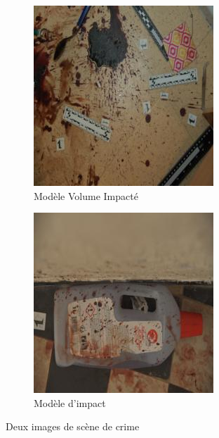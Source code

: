 \documentclass[a4paper]{article}
\begin{document}
\begin{figure}[H]
    \centering
    \begin{subfigure}{0.40\linewidth}
        \centering
        \includegraphics[width=\linewidth]{../asset/data_real/12.jpg}
        \caption{Modèle Volume Impacté}
    \end{subfigure}
    \begin{subfigure}{0.40\linewidth}
        \centering
        \includegraphics[width=\linewidth]{../asset/data_real/15.jpg}
        \caption{Modèle d'impact}
    \end{subfigure}
    \caption{Deux images de scène de crime}
    \label{fig: reals images}
\end{figure}
\end{document}
